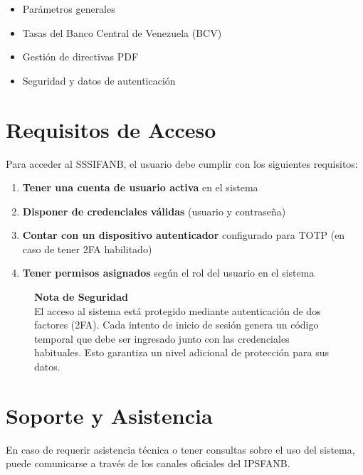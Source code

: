 \begin{itemize}[leftmargin=*]
    \item Parámetros generales
    \item Tasas del Banco Central de Venezuela (BCV)
    \item Gestión de directivas PDF
    \item Seguridad y datos de autenticación
\end{itemize}

\section{Requisitos de Acceso}

Para acceder al SSSIFANB, el usuario debe cumplir con los siguientes requisitos:

\begin{enumerate}[leftmargin=*]
    \item \textbf{Tener una cuenta de usuario activa} en el sistema
    \item \textbf{Disponer de credenciales válidas} (usuario y contraseña)
    \item \textbf{Contar con un dispositivo autenticador} configurado para TOTP (en caso de tener 2FA habilitado)
    \item \textbf{Tener permisos asignados} según el rol del usuario en el sistema
\end{enumerate}

\begin{figure}[H]
\centering
\begin{tcolorbox}[
    enhanced,
    colback=sandraSoft,
    colframe=sandraAccent,
    width=0.9\textwidth,
    halign=center
]
\small
\textbf{Nota de Seguridad}\\
\smallskip
El acceso al sistema está protegido mediante autenticación de dos factores (2FA). Cada intento de inicio de sesión genera un código temporal que debe ser ingresado junto con las credenciales habituales. Esto garantiza un nivel adicional de protección para sus datos.
\end{tcolorbox}
\end{figure}

\section{Soporte y Asistencia}

En caso de requerir asistencia técnica o tener consultas sobre el uso del sistema, puede comunicarse a través de los canales oficiales del IPSFANB.

\newpage
